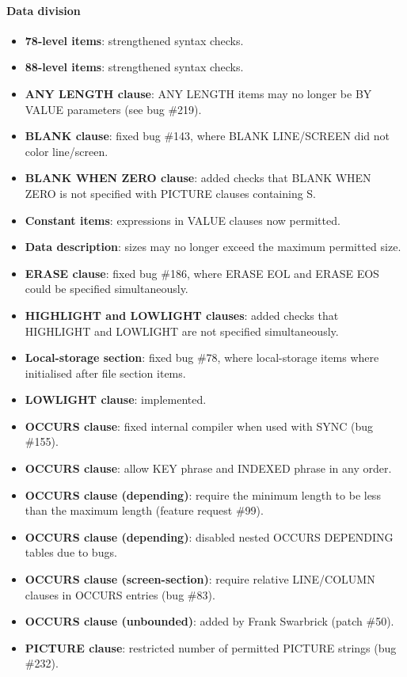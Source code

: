 \paragraph{Data division}
\begin{itemize}
\item \textbf{78-level items}: strengthened syntax checks.
\item \textbf{88-level items}: strengthened syntax checks.
\item \textbf{ANY LENGTH clause}: ANY LENGTH items may no longer be BY VALUE parameters (see bug \#219).
\item \textbf{BLANK clause}: fixed bug \#143, where BLANK LINE\slash{}SCREEN did not color line\slash{}screen.
\item \textbf{BLANK WHEN ZERO clause}: added checks that BLANK WHEN ZERO is not specified with PICTURE clauses containing S.
\item \textbf{Constant items}: expressions in VALUE clauses now permitted.
\item \textbf{Data description}: sizes may no longer exceed the maximum permitted size.
\item \textbf{ERASE clause}: fixed bug \#186, where ERASE EOL and ERASE EOS could be specified simultaneously.
\item \textbf{HIGHLIGHT and LOWLIGHT clauses}: added checks that HIGHLIGHT and LOWLIGHT are not specified simultaneously.
\item \textbf{Local-storage section}: fixed bug \#78, where local-storage items where initialised after file section items.
\item \textbf{LOWLIGHT clause}: implemented.
\item \textbf{OCCURS clause}: fixed internal compiler when used with SYNC (bug \#155).
\item \textbf{OCCURS clause}: allow KEY phrase and INDEXED phrase in any order.
\item \textbf{OCCURS clause (depending)}: require the minimum length to be less than the maximum length (feature request \#99).
\item \textbf{OCCURS clause (depending)}: disabled nested OCCURS DEPENDING tables due to bugs.
\item \textbf{OCCURS clause (screen-section)}: require relative LINE\slash{}COLUMN clauses in OCCURS entries (bug \#83).
\item \textbf{OCCURS clause (unbounded)}: added by Frank Swarbrick (patch \#50).
\item \textbf{PICTURE clause}: restricted number of permitted PICTURE strings (bug \#232).

\end{itemize}
